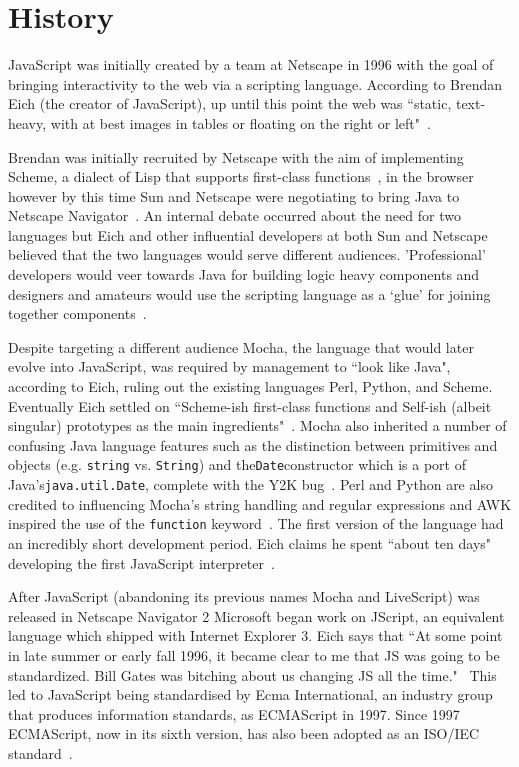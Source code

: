 \documentclass[]{final_report}
\begin{document}
\section{History}

JavaScript was initially created by a team at Netscape in 1996 with the goal of bringing interactivity to the web via a scripting language. According to Brendan Eich (the creator of JavaScript), up until this point the web was ``static, text-heavy, with at best images in tables or floating on the right or left"~\cite{AZProgrammingLanguages}. 

Brendan was initially recruited by Netscape with the aim of implementing Scheme, a dialect of Lisp that supports first-class functions~\cite{dybvig1996scheme}, in the browser however by this time Sun and Netscape were negotiating to bring Java to Netscape Navigator~\cite{popularityofjavascript}. An internal debate occurred about the need for two languages but Eich and other influential developers at both Sun and Netscape believed that the two languages would serve different audiences. 'Professional' developers would veer towards Java for building logic heavy components and designers and amateurs would use the scripting language as a `glue' for joining together components~\cite{AZProgrammingLanguages}.

Despite targeting a different audience Mocha, the language that would later evolve into JavaScript, was required by management to ``look like Java", according to Eich, ruling out the existing languages Perl, Python, and Scheme. Eventually Eich settled on ``Scheme-ish first-class functions and Self-ish (albeit singular) prototypes as the main ingredients"~\cite{popularityofjavascript}. Mocha also inherited a number of confusing Java language features such as the distinction between primitives and objects (e.g. \lstinline{string} vs. \lstinline{String}) and the\lstinline{Date}constructor which is a port of Java's\lstinline{java.util.Date}, complete with the Y2K bug~\cite{brendaneichtimetomakejscomment}. Perl and Python are also credited to influencing Mocha's string handling and regular expressions and AWK inspired the use of the \lstinline{function} keyword~\cite{briefhistoryofjavascript}. The first version of the language had an incredibly short development period. Eich claims he spent ``about ten days" developing the first JavaScript interpreter~\cite{AZProgrammingLanguages}.

After JavaScript (abandoning its previous names Mocha and LiveScript) was released in Netscape Navigator 2 Microsoft began work on JScript, an equivalent language which shipped with Internet Explorer 3. Eich says that ``At some point in late summer or early fall 1996, it became clear to me that JS was going to be standardized. Bill Gates was bitching about us changing JS all the time."~\cite{newjavascriptmoduleowner} This led to JavaScript being standardised by Ecma International, an industry group that produces information standards, as ECMAScript in 1997. Since 1997 ECMAScript, now in its sixth version, has also been adopted as an ISO/IEC standard~\cite{ISO/IEC16262:2011}.
\end{document}
